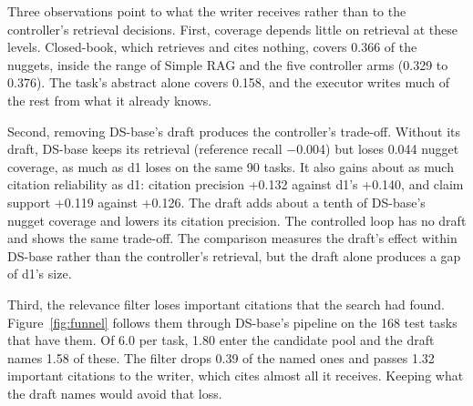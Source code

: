 \documentclass[11pt, letterpaper]{article}
\begin{document}
Three observations point to what the writer receives rather than to the controller's retrieval
decisions. First, coverage depends little on retrieval at these levels. Closed-book, which retrieves and cites
nothing, covers 0.366 of the nuggets, inside the range of Simple RAG and the five controller arms
(0.329 to 0.376). The task's abstract alone covers 0.158, and the executor writes much of the rest
from what it already knows.

Second, removing DS-base's draft produces the controller's trade-off. Without its draft, DS-base
keeps its retrieval (reference recall $-$0.004) but loses 0.044 nugget coverage, as much as d1 loses
on the same 90 tasks. It also gains about as much citation reliability as d1: citation precision
+0.132 against d1's +0.140, and claim support +0.119 against +0.126. The draft adds about a tenth of
DS-base's nugget coverage and lowers its citation precision. The controlled loop has no draft and
shows the same trade-off. The comparison measures the draft's effect within DS-base rather than the
controller's retrieval, but the draft alone produces a gap of d1's size.

Third, the relevance filter loses important citations that the search had found.
Figure~\ref{fig:funnel} follows them through DS-base's pipeline on the 168 test tasks that have
them. Of 6.0 per task, 1.80 enter the candidate pool and the draft names 1.58 of these. The filter
drops 0.39 of the named ones and passes 1.32 important citations to the writer, which cites almost
all it receives. Keeping what the draft names would avoid that loss.
\end{document}
